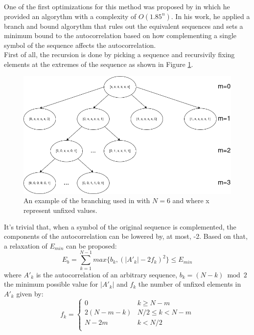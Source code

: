   One of the first optimizations for this method was
  proposed by \citet{Mertens_1996} in which he provided an algorythm
  with a complexity of $O(1.85^n)$. In his work, he applied a branch and bound
  algorythm that rules out the equivalent sequences and sets a minimum bound
  to the autocorrelation based on how complementing a single symbol of the
  sequence affects the autocorrelation.\\

  First of all, the recursion is done by picking a sequence and recursivily
  fixing elements at the extremes of the sequence as shown in Figure
  \ref{prn_search:fig:1}.\\

  \begin{figure}[ht!]
    \includegraphics[scale=0.6]{Chapters/prn_search/branching_example.png}
    \caption{An example of the branching used in \citet{Mertens_1996} with
    $N = 6$ and where x represent unfixed values.}
    \label{prn_search:fig:1}
  \end{figure}

  It's trivial that, when a symbol of the original sequence is complemented,
  the components of the autocorrelation can be lowered by, at most, -2. Based on
  that, a relaxation of $E_{min}$ can be proposed:\\
  \begin{equation}
    E_b = \sum_{k=1}^{N-1}max\{b_k, (|A'_k| - 2f_k)^2\} \leq E_{min}
  \end{equation}
  where $A'_k$ is the autocorrelation of an arbitrary sequence, $b_k = (N -
  k) \bmod 2$ the minimum possible value for $|A'_k|$ and $f_k$ the number of
  unfixed elements in $A'_k$ given by:
  \begin{equation}
    f_k = \left\{\begin{array}{ll}
        0 & k \geq N - m \\
        2(N - m - k) & N/2 \leq k < N - m\\
        N - 2m & k < N/2 \\
    \end{array}\right.
  \end{equation}

